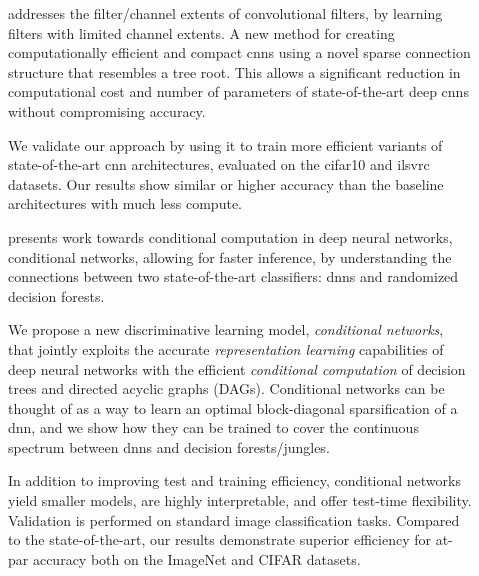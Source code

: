 \documentclass[thesis]{subfiles}
\begin{document}
\begin{description}
	\item[] addresses the filter/channel extents of convolutional filters, by learning filters with limited channel extents. A new method for creating computationally efficient and compact \glspl{cnn} using a novel sparse connection structure that resembles a tree root. This allows a significant reduction in computational cost and number of parameters of state-of-the-art deep \glspl{cnn} without compromising accuracy. 
	
	We validate our approach by using it to train more efficient variants of state-of-the-art \gls{cnn} architectures, evaluated on the \gls{cifar10} and \gls{ilsvrc} datasets. Our results show similar or higher accuracy than the baseline architectures with much less compute. %
	
	\item[] presents work towards conditional computation in deep neural networks, conditional networks, allowing for faster inference, by understanding the connections between two state-of-the-art classifiers: \glspl{dnn} and randomized decision forests.
	
	We propose a new discriminative learning model, \emph{conditional networks}, 
	that jointly exploits the accurate \emph{representation learning} capabilities of deep neural networks with the efficient \emph{conditional computation} of decision trees and directed acyclic graphs (DAGs).
	Conditional networks can be thought of as a way to learn an optimal block-diagonal sparsification of a \gls{dnn}, and we show how they can be trained to cover the continuous spectrum between \glspl{dnn} and decision forests/jungles. 
	
	In addition to improving test and training efficiency, conditional networks yield smaller models, are highly interpretable, and offer test-time flexibility. Validation is performed on standard image classification tasks. Compared to the state-of-the-art, our results demonstrate superior efficiency for at-par accuracy both on the ImageNet and CIFAR datasets.
	

\end{description}
\end{document}
